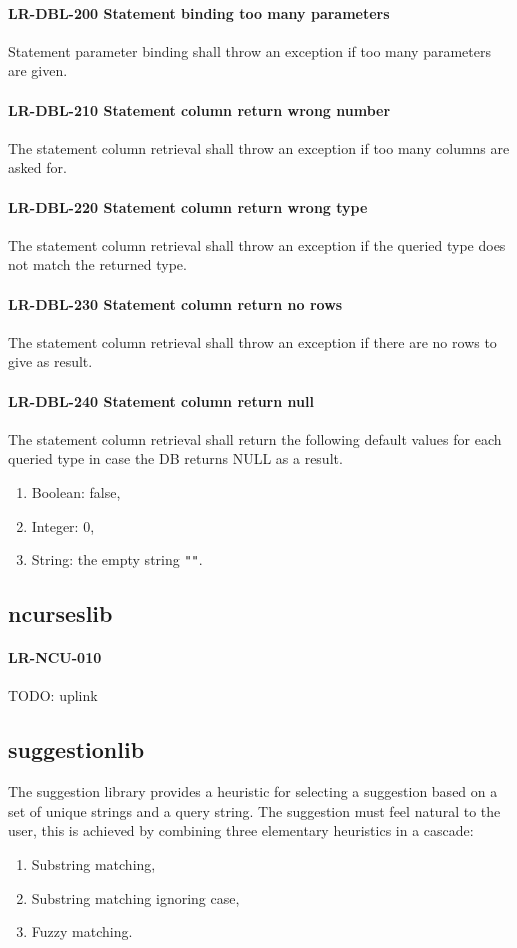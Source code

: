 \paragraph{LR-DBL-200 Statement binding too many parameters}
Statement parameter binding shall throw an exception if
too many parameters are given.

\paragraph{LR-DBL-210 Statement column return wrong number}
The statement column retrieval shall throw an exception if too many
columns are asked for.

\paragraph{LR-DBL-220 Statement column return wrong type}
The statement column retrieval shall throw an exception if the
queried type does not match the returned type.

\paragraph{LR-DBL-230 Statement column return no rows}
The statement column retrieval shall throw an exception if
there are no rows to give as result.

\paragraph{LR-DBL-240 Statement column return null}
The statement column retrieval shall return the following
default values for each queried type in case the DB returns
NULL as a result.
\begin{enumerate}
\item Boolean: false,
\item Integer: 0,
\item String: the empty string \lstinline{""}.
\end{enumerate}

\subsection{ncurses\textunderscore lib}
\paragraph{LR-NCU-010}
TODO: uplink

\subsection{suggestion\textunderscore lib}
The suggestion library provides a heuristic for selecting a suggestion
based on a set of unique strings and a query string. The suggestion
must feel natural to the user, this is achieved by combining three
elementary heuristics in a cascade:
\begin{enumerate}
\item Substring matching,
\item Substring matching ignoring case,
\item Fuzzy matching.
\end{enumerate}

